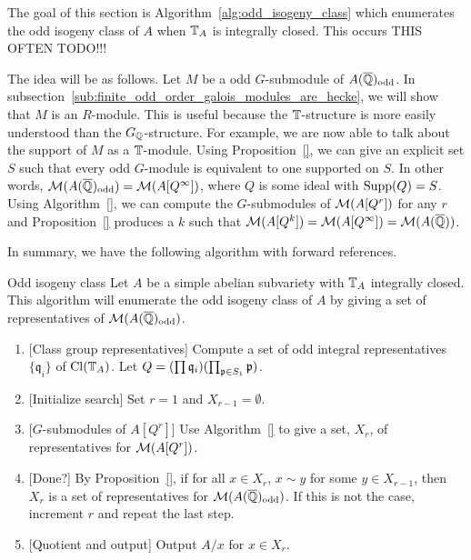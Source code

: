 \documentclass{article}
\renewcommand{\q}{\mathfrak{q}}
\newcommand{\odd}{\mathrm{odd}}
\begin{document}
The goal of this section is Algorithm~\ref{alg:odd_isogeny_class} which
enumerates the odd isogeny class of $A$ when $\mathbb{T}_A$ is integrally closed. This
occurs THIS OFTEN TODO!!!

The idea will be as follows. Let $M$ be a odd $G$-submodule of
$A(\QQbar)_\odd$. In
subsection~\ref{sub:finite_odd_order_galois_modules_are_hecke}, we will show
that $M$ is an $R$-module. This is useful because the $\mathbb{T}$-structure is more
easily understood than the $G_{\mathbb{Q}}$-structure. For example, we are now able to
talk about the support of $M$ as a $\mathbb{T}$-module. Using Proposition~\ref{}, we
can give an explicit set $S$ such that every odd $G$-module is
equivalent to one supported on $S$. In other words,
$\M(A(\QQbar)_\odd)=\M(A[Q^\infty])$, where $Q$ is some ideal with
$\operatorname{Supp}(Q)=S$. Using Algorithm~\ref{}, we can compute the $G$-submodules of
$\mathcal{M}(A[Q^r])$ for any $r$ and Proposition~\ref{} produces a $k$ such that
$\mathcal{M}(A[Q^k])=\mathcal{M}(A[Q^\infty])=\mathcal{M}(A(\overline{\mathbb{Q}}))$.

In summary, we have the following algorithm with forward references.
\begin{algorithm}{Odd isogeny class}%
    \label{alg:odd_isogeny_class}
    Let $A$ be a simple abelian subvariety with $\mathbb{T}_A$ integrally closed. This
    algorithm will enumerate the odd isogeny class of $A$ by giving a set of
    representatives of $\M(A(\QQbar)_\odd)$.
    \begin{enumerate}
        \item{} [Class group representatives]
            Compute a set of odd integral representatives $\{\q_i\}$ of
            $\operatorname{Cl}(\mathbb{T}_A)$. Let $Q = (\prod \q_i)(\prod_{\p\in S_1} \p)$. 
        \item{} [Initialize search]
            Set $r=1$ and $X_{r-1}=\emptyset$.
        \item{} [$G$-submodules of $A[Q^r]$]
            Use Algorithm~\ref{} to give a set, $X_r$, of representatives for
            $\mathcal{M}(A[Q^r])$.
        \item{} [Done?]
            By Proposition~\ref{}, if for all $x\in X_r$, $x\sim y$ for some
            $y\in X_{r-1}$, then $X_r$ is a set of representatives for
            $\M(A(\QQbar)_\odd)$. If this is not the case, increment $r$ and
            repeat the last step.
        \item{} [Quotient and output]
            Output $A/x$ for $x\in X_r$.
    \end{enumerate}
\end{algorithm}
\end{document}
